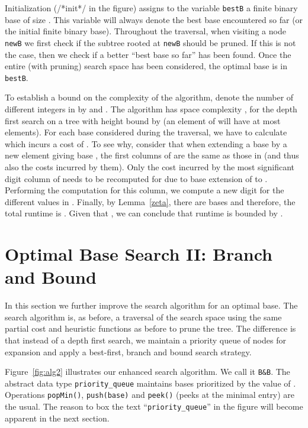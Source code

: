 \documentclass[envcountsame]{llncs}
\begin{document}
Initialization ({\scriptsize /*init*/} in the figure) assigns to the
variable \texttt{bestB} a finite binary base of size
. This variable will always denote the
best base encountered so far (or the initial finite binary base).
Throughout the traversal, when visiting a node \texttt{newB} we first
check if the subtree rooted at \texttt{newB} should be pruned. If this
is not the case, then we check if a better ``best base so far'' has
been found. Once the entire (with pruning) search space has been
considered, the optimal base is in \texttt{bestB}.

To establish a bound on the complexity of the algorithm,  denote
the number of different integers in  by  and .  
The algorithm has space complexity , for the depth first
search on a tree with height bound by  (an element of
 will have at most  elements).
For each base considered during the traversal, we have to calculate
 which incurs a cost of .  To see why, consider that
when extending a base  by a new element giving base , the first
columns of  are the same as those in  (and thus
also the costs incurred by them). Only the cost incurred by the most
significant digit column of  needs to be recomputed for
 due to base extension of  to . 
Performing the
computation for this column, we compute a new digit for the 
different values in .
Finally, by Lemma~\ref{zeta}, there are  bases and
therefore, the total runtime is . Given that ,
we can conclude that runtime is bounded by .



\section{Optimal Base Search II: Branch and Bound}
\label{sec:ob2}

In this section we further improve the search algorithm for an optimal
base. 
The search algorithm is, as before, a traversal of the search space
using the same partial cost and heuristic functions as before to prune
the tree. The difference is that instead of a depth first search, we
maintain a priority queue of nodes for expansion and apply a
best-first, branch and bound search strategy.


Figure~\ref{fig:alg2} illustrates our enhanced search algorithm. We
call it \texttt{B\&B}.
The abstract data type \texttt{priority\_queue} maintains bases
prioritized by the value of . Operations
\texttt{popMin()}, \texttt{push(base)} and \texttt{peek()} (peeks at
the minimal entry) are the usual. The reason to box the text
``\texttt{priority\_queue}'' in the figure will become apparent in
the next section.
\end{document}
